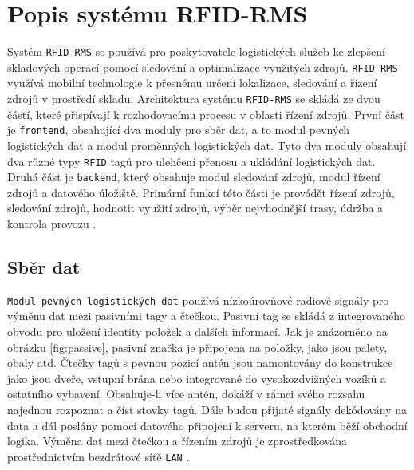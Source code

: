 \documentclass[czech,BP]{thesiskiv}
\begin{document}
\section{Popis systému RFID-RMS}
Systém \texttt{RFID-RMS} se používá pro poskytovatele logistických služeb ke zlepšení skladových operací pomocí sledování a optimalizace využitých zdrojů. \texttt{RFID-RMS} využívá mobilní technologie k přesnému určení lokalizace, sledování a řízení zdrojů v prostředí skladu. Architektura systému \texttt{RFID-RMS} se skládá ze dvou částí, které přispívají k rozhodovacímu procesu v oblasti řízení zdrojů. První část je \texttt{frontend}, obsahující dva moduly pro sběr dat, a to modul pevných logistických dat a modul proměnných logistických dat. Tyto dva moduly obsahují dva různé typy \texttt{RFID} tagů pro ulehčení přenosu a ukládání logistických dat. Druhá část je \texttt{backend}, který obsahuje modul sledování zdrojů, modul řízení zdrojů a datového úložiště. Primární funkcí této části je provádět řízení zdrojů, sledování zdrojů, hodnotit využití zdrojů, výběr nejvhodnější trasy, údržba a kontrola provozu \cite{chow2006design}.

\subsection{Sběr dat}
\texttt{Modul pevných logistických dat} používá nízkoúrovňové radiové signály pro výměnu dat mezi pasivními tagy a čtečkou. Pasivní tag se skládá z integrovaného obvodu pro uložení identity položek a dalších informací. Jak je znázorněno na obrázku \ref{fig:passive}, pasivní značka je připojena na položky, jako jsou palety, obaly atd. Čtečky tagů s pevnou pozicí antén jsou namontovány do konstrukce jako jsou dveře, vstupní brána nebo integrované do vysokozdvižných vozíků a ostatního vybavení. Obsahuje-li více antén, dokáží v rámci svého rozsahu najednou rozpoznat a číst stovky tagů. Dále budou přijaté signály dekódovány na data a dál poslány pomocí datového připojení k serveru, na kterém běží obchodní logika. Výměna dat mezi čtečkou a řízením zdrojů je zprostředkována prostřednictvím bezdrátové sítě \texttt{LAN} \cite{chow2006design}.
\end{document}
